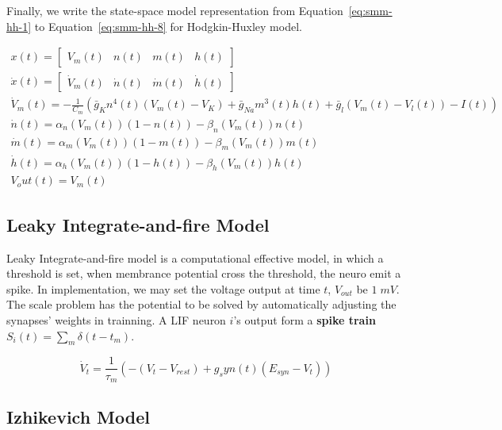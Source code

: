 Finally, we write the state-space model representation from Equation~\ref{eq:smm-hh-1} to 
Equation~\ref{eq:smm-hh-8} for Hodgkin-Huxley model.

\begin{align}
    x(t) = \begin{bmatrix}V_m(t) & n(t) & m(t) & h(t)\end{bmatrix} \label{eq:smm-hh-1}\\
    \dot x(t) = \begin{bmatrix}\dot V_m(t) & \dot n(t) & \dot m(t) & \dot h(t)\end{bmatrix}\label{eq:smm-hh-2} \\
    \dot V_m(t) = -\frac{1}{C_m}(\bar g_Kn^4(t)(V_m(t)-V_K)+\bar g_{Na}m^3(t)h(t)+\bar g_l(V_m(t)-V_l(t)) - I(t)) \label{eq:smm-hh-4}\\
    \dot n(t)= \alpha_n(V_m(t))(1-n(t))-\beta_n(V_m(t))n(t) \label{eq:smm-hh-5}\\
    \dot m(t)= \alpha_m(V_m(t))(1-m(t))-\beta_m(V_m(t))m(t) \label{eq:smm-hh-6}\\
    \dot h(t)= \alpha_h(V_m(t))(1-h(t))-\beta_h(V_m(t))h(t) \label{eq:smm-hh-7}\\
    V_out(t) = V_m(t) \label{eq:smm-hh-8}
\end{align}


\subsection{Leaky Integrate-and-fire Model}
\label{sec:current-based-lif}
Leaky Integrate-and-fire model is a computational effective model, 
in which a threshold is set, when membrance potential cross the threshold, 
the neuro emit a spike. 
In implementation, we may set the voltage output at time $t$, $V_{out}$ be $1\;mV$. 
The scale problem has the potential to be solved by automatically adjusting the synapses' weights 
in trainning.
A LIF neuron $i$'s output form a \textbf{spike train} $S_{i}(t) = \sum_{m}\delta(t-t_m)$.

\begin{equation}\label{eq:lif}
    \dot V_t = \frac{1}{\tau_m}(-(V_t-V_{rest})+g_syn(t)(E_{syn}-V_t))
\end{equation}


\subsection{Izhikevich Model}

